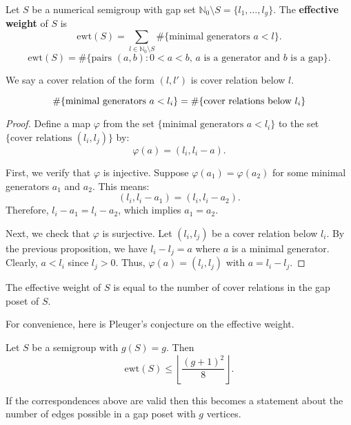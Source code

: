 \documentclass[11pt]{article}
\newcommand{\term}[1]{\textbf{#1}}
\begin{document}
\begin{definition}
        Let \( S \) be a numerical semigroup with gap set \( \mathbb{N}_0 \setminus S = \{ l_1, \ldots, l_g \} \).
    The \term{effective weight} of \( S \) is
    \[
    \text{ewt}(S) = \sum_{l \in \mathbb{N}_0 \setminus S} \# \{ \text{minimal generators } a < l \}.
    \]
    \[
    \text{ewt}(S) = \# \{ \text{pairs } (a, b) : 0 < a < b, \, a \text{ is a generator and } b \text{ is a gap} \}.
    \]
\end{definition}

We say a cover relation of the form \((l, l')\) is cover relation below \(l\).

\begin{proposition}
\[\# \{ \text{minimal generators } a < l_i \} = \# \{\text{cover relations below \( l_i \)}\}\]
\end{proposition}

\begin{proof}
Define a map \(\varphi\) from the set \(\{\text{minimal generators } a < l_i\}\) to the set \(\{\text{cover relations } (l_i, l_j)\}\) by:
\[
\varphi(a) = (l_i, l_i - a).
\]

First, we verify that \(\varphi\) is injective. Suppose \(\varphi(a_1) = \varphi(a_2)\) for some minimal generators \(a_1\) and \(a_2\). This means:
\[
(l_i, l_i - a_1) = (l_i, l_i - a_2).
\]
Therefore, \(l_i - a_1 = l_i - a_2\), which implies \(a_1 = a_2\).

Next, we check that \(\varphi\) is surjective. Let \((l_i, l_j)\) be a cover relation below \( l_i \). By the previous proposition, we have \(l_i - l_j = a\) where \(a\) is a minimal generator. Clearly, \(a < l_i\) since \(l_j > 0\). Thus, \(\varphi(a) = (l_i, l_j)\) with \(a = l_i - l_j\).
\end{proof}

\begin{corollary}
The effective weight of \(S\) is equal to the number of cover relations in the gap poset of \(S\).
\end{corollary}

For convenience, here is Pleuger's conjecture on the effective weight.

\begin{conjecture}
    Let \( S \) be a semigroup with \( g(S) = g \). Then
    \[
    \text{ewt}(S) \leq \left\lfloor \frac{(g + 1)^2}{8} \right\rfloor.
    \]
\end{conjecture}

If the correspondences above are valid then this becomes a statement about the number of edges possible in a gap poset with \(g\) vertices.
\end{document}
